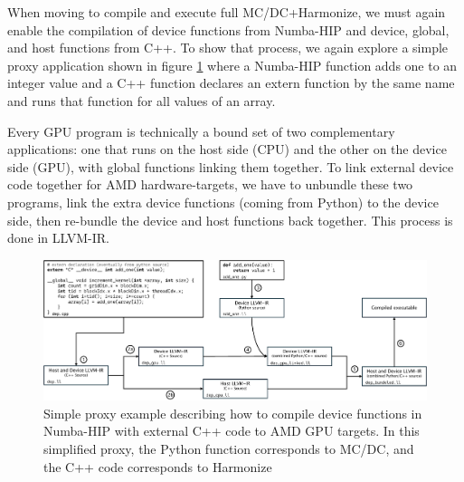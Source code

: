 When moving to compile and execute full MC/DC+Harmonize, we must again enable the compilation of device functions from Numba-HIP and device, global, and host functions from C++.
To show that process, we again explore a simple proxy application shown in figure \ref{fig:codeclang} where a Numba-HIP function adds one to an integer value and a C++ function declares an extern function by the same name and runs that function for all values of an array.

Every GPU program is technically a bound set of two complementary applications: one that runs on the host side (CPU) and the other on the device side (GPU), with global functions linking them together.
To link external device code together for AMD hardware-targets, we have to unbundle these two programs, link the extra device functions (coming from Python) to the device side, then re-bundle the device and host functions back together.
This process is done in LLVM-IR.

\begin{figure}
  \centering
  \includegraphics[width=\textwidth]{appendix/mcdc_prof_figs/flowclang.pdf}
  \caption{Simple proxy example describing how to compile device functions in Numba-HIP with external C++ code to AMD GPU targets. In this simplified proxy, the Python function corresponds to MC/DC, and the C++ code corresponds to Harmonize}
  \label{fig:codeclang}
\end{figure}

